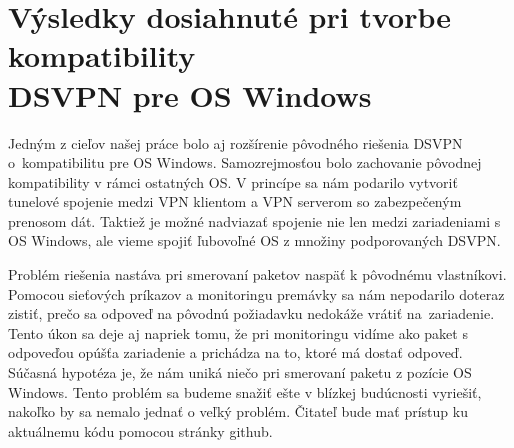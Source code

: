 \section{Výsledky dosiahnuté pri tvorbe kompatibility \\DSVPN pre OS Windows}
Jedným z cieľov našej práce bolo aj rozšírenie pôvodného riešenia DSVPN o~kompatibilitu pre OS Windows. Samozrejmosťou bolo zachovanie pôvodnej kompatibility v rámci ostatných OS. V princípe sa nám podarilo vytvoriť tunelové spojenie medzi VPN klientom a VPN serverom so zabezpečeným prenosom dát. Taktiež je možné nadviazať spojenie nie len medzi zariadeniami s OS Windows, ale vieme spojiť ľubovoľné OS z množiny podporovaných DSVPN.  

Problém riešenia nastáva pri smerovaní paketov naspäť k pôvodnému vlastníkovi. Pomocou sieťových príkazov a monitoringu premávky sa nám nepodarilo doteraz zistiť, prečo sa odpoveď na pôvodnú požiadavku nedokáže vrátiť na~zariadenie. Tento úkon sa deje aj napriek tomu, že pri monitoringu vidíme ako paket s odpoveďou opúšťa zariadenie a prichádza na to, ktoré má dostať odpoveď. Súčasná hypotéza je, že nám uniká niečo pri smerovaní paketu z pozície OS Windows. Tento problém sa budeme snažiť ešte v blízkej budúcnosti vyriešiť, nakoľko by sa nemalo jednať o veľký problém. Čitateľ bude mať prístup ku aktuálnemu kódu pomocou stránky github.   